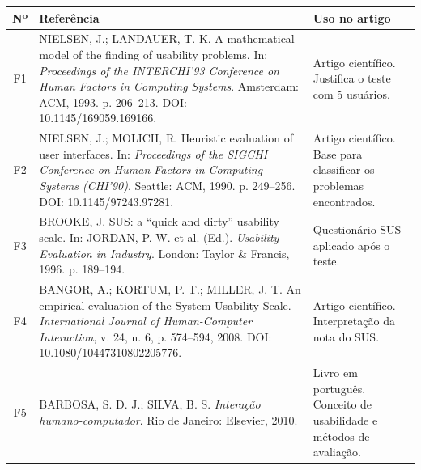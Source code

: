 \documentclass[a4paper,12pt]{article}
\begin{document}
\begin{xltabular}{\linewidth}{|c|Y|Y|}
  \hline
  \textbf{Nº} & \textbf{Referência} & \textbf{Uso no artigo} \\ \hline
  F1 & NIELSEN, J.; LANDAUER, T. K. A mathematical model of the finding of usability problems. In: \emph{Proceedings of the INTERCHI'93 Conference on Human Factors in Computing Systems}. Amsterdam: ACM, 1993. p. 206--213. DOI: 10.1145/169059.169166. & Artigo científico. Justifica o teste com 5 usuários. \\ \hline
  F2 & NIELSEN, J.; MOLICH, R. Heuristic evaluation of user interfaces. In: \emph{Proceedings of the SIGCHI Conference on Human Factors in Computing Systems (CHI'90)}. Seattle: ACM, 1990. p. 249--256. DOI: 10.1145/97243.97281. & Artigo científico. Base para classificar os problemas encontrados. \\ \hline
  F3 & BROOKE, J. SUS: a ``quick and dirty'' usability scale. In: JORDAN, P. W. et al. (Ed.). \emph{Usability Evaluation in Industry}. London: Taylor \& Francis, 1996. p. 189--194. & Questionário SUS aplicado após o teste. \\ \hline
  F4 & BANGOR, A.; KORTUM, P. T.; MILLER, J. T. An empirical evaluation of the System Usability Scale. \emph{International Journal of Human-Computer Interaction}, v. 24, n. 6, p. 574--594, 2008. DOI: 10.1080/10447310802205776. & Artigo científico. Interpretação da nota do SUS. \\ \hline
  F5 & BARBOSA, S. D. J.; SILVA, B. S. \emph{Interação humano-computador}. Rio de Janeiro: Elsevier, 2010. & Livro em português. Conceito de usabilidade e métodos de avaliação. \\ \hline
\end{xltabular}
\end{document}
